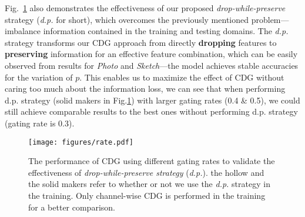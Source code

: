 Fig.~\ref{fig:rate} also demonstrates the effectiveness of our proposed \textit{drop-while-preserve} strategy (\textit{\textit{d.p.}} for short), which overcomes the previously mentioned problem---imbalance information contained in the training and testing domains. The \textit{d.p.} strategy transforms our CDG approach from directly \textbf{dropping} features to \textbf{preserving} information for an effective feature combination, which can be easily observed from results for \textit{Photo} and \textit{Sketch}---the model achieves stable accuracies for the variation of $p$. This enables us to maximize the effect of CDG without caring too much about the information loss, \ie we can see that when performing d.p. strategy (solid makers in Fig.\ref{fig:rate}) with larger gating rates (0.4 \& 0.5), we could still achieve comparable results to the best ones without performing d.p. strategy (gating rate is 0.3).  

\begin{figure}
  \centering
  \texttt{[image: figures/rate.pdf]}
  \caption{The performance of CDG using different gating rates to validate the effectiveness of \textit{drop-while-preserve strategy} (\textit{d.p.}). the hollow and the solid makers refer to whether or not we use the \textit{d.p.} strategy in the training. Only channel-wise CDG is performed in the training for a better comparison.}
  \label{fig:rate}
\end{figure}

